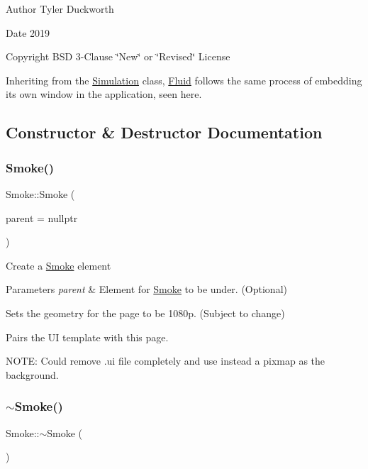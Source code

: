 \begin{DoxyAuthor}{Author}
Tyler Duckworth 
\end{DoxyAuthor}
\begin{DoxyDate}{Date}
2019 
\end{DoxyDate}
\begin{DoxyCopyright}{Copyright}
B\+SD 3-\/Clause \char`\"{}\+New\char`\"{} or \char`\"{}\+Revised\char`\"{} License
\end{DoxyCopyright}
Inheriting from the \mbox{\hyperlink{classSimulation}{Simulation}} class, \mbox{\hyperlink{classFluid}{Fluid}} follows the same process of embedding its own window in the application, seen here. 

\subsection{Constructor \& Destructor Documentation}
\mbox{\label{classSmoke_a37d4531eec55ecb9085bf7b1a6b03228}} 
\subsubsection{\texorpdfstring{Smoke()}{Smoke()}}
{\footnotesize\ttfamily Smoke\+::\+Smoke (\begin{DoxyParamCaption}\item[{Q\+Widget $\ast$}]{parent = {\ttfamily nullptr} }\end{DoxyParamCaption})\hspace{0.3cm}{\ttfamily [explicit]}}

Create a \mbox{\hyperlink{classSmoke}{Smoke}} element 
\begin{DoxyParams}{Parameters}
{\em parent} & Element for \mbox{\hyperlink{classSmoke}{Smoke}} to be under. (Optional)\\
\hline
\end{DoxyParams}
Sets the geometry for the page to be 1080p. (Subject to change)

Pairs the UI template with this page.

N\+O\+TE\+: Could remove .ui file completely and use instead a pixmap as the background. \mbox{\label{classSmoke_a545ad6bf5610bf9bbe3e62967db1fff9}} 
\subsubsection{\texorpdfstring{$\sim$Smoke()}{~Smoke()}}
{\footnotesize\ttfamily Smoke\+::$\sim$\+Smoke (\begin{DoxyParamCaption}{ }\end{DoxyParamCaption})}



